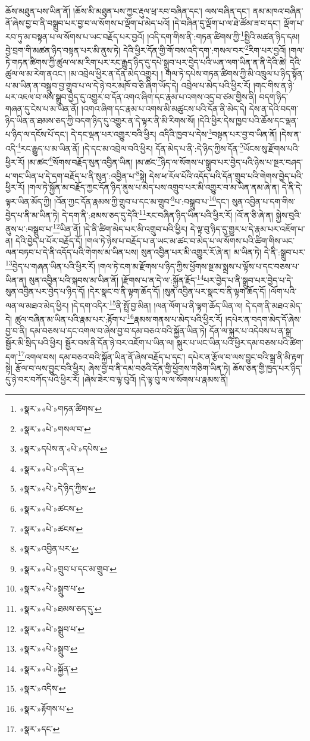 ཆོས་མཐུན་པས་ཡིན་ནོ། །ཆོས་མི་མཐུན་པས་ཀྱང་རྡུལ་ཕྲ་རབ་བཞིན་དང་། ལས་བཞིན་དང་། ནམ་མཁའ་བཞིན་ནོ་ཞེས་བྱ་བ་ནི་བསྒྲུབ་པར་བྱ་བ་ལ་སོགས་པ་ལྡོག་པ་མེད་པའོ། །དེ་བཞིན་དུ་ལྡོག་པ་ལ་ཐེ་ཚོམ་ཟ་བ་དང་། ལྡོག་པ་རབ་ཏུ་མ་བསྟན་པ་ལ་སོགས་པ་ཡང་བརྗོད་པར་བྱའོ། །འདི་དག་གིས་ནི་:གཏན་ཚིགས་ཀྱི་\footnote{«སྣར་»«པེ་»གཏན་ཚིགས་}སྤྱིའི་མཚན་ཉིད་དམ། བྱེ་བྲག་གི་མཚན་ཉིད་བསྟན་པར་མི་ནུས་ཏེ། དེའི་ཕྱིར་དོན་གྱི་གོ་བས་འདི་དག་:གསལ་བར་\footnote{«སྣར་»«པེ་»གསལ་བ་}རིག་པར་བྱའོ། །གལ་ཏེ་གཏན་ཚིགས་ཀྱི་ཚུལ་ལ་མ་རིག་པར་རང་རྒྱུད་ཉིད་དུ་དཔེ་སྒྲུབ་པར་བྱེད་པའི་ཡན་ལག་ཡིན་ན་ནི་དེའི་ཚེ། དེའི་ཚུལ་ལ་མ་རེག་ནའང་། །མ་འབྲེལ་ཕྱིར་ན་དོན་མེད་འགྱུར། །
གལ་ཏེ་དཔེས་གཏན་ཚིགས་ཀྱི་མི་འཁྲུལ་པ་ཉིད་སྟོན་པ་མ་ཡིན་ན་བསྒྲུབ་བྱ་གྲུབ་པ་ལ་དེ་ཉེ་བར་མཁོ་བ་ཅི་ཞིག་ཡོད་དེ། འབྲེལ་པ་མེད་པའི་ཕྱིར་རོ། །གང་གིས་ན་ཉེ་པར་འཇལ་བ་ལས་སྒྲུབ་བྱེད་དུ་འགྱུར་བ་དོན་འགའ་ཞིག་དང་རྣམ་པ་འགས་འདྲ་བ་ཙམ་གྱིས་ནི། བདག་ཉིད་གཞན་དུ་ངེས་པ་མ་ཡིན་ནོ། །འགའ་ཞིག་དང་རྣམ་པ་འགས་མི་མཚུངས་པའི་དོན་ནི་མེད་དེ། དེས་ན་དེའི་བདག་ཉིད་ཡིན་ན་ཐམས་ཅད་ཀྱི་བདག་ཉིད་དུ་འགྱུར་ན་དེ་ལྟར་ནི་མི་རིགས་སོ། །དེའི་ཕྱིར་དེས་ཁྱབ་པའི་ཆོས་དང་ལྡན་པ་ཉིད་ལ་དངོས་པོ་དང་། དེ་དང་ལྡན་པར་འགྱུར་བའི་ཕྱིར། འདིའི་ཁྱབ་པ་དེས་\footnote{«སྣར་»དཔེས་ན་«པེ་»དཔེས་}བསྟན་པར་བྱ་བ་ཡིན་ནོ། །དེས་ན་འདི་\footnote{«སྣར་»«པེ་»འདི་ན་}རང་རྒྱུད་པ་མ་ཡིན་ནོ། །དེ་དང་མ་འབྲེལ་བའི་ཕྱིར། དོན་མེད་པ་ནི་:དེ་ཉིད་ཀྱིས་དོན་\footnote{«སྣར་»«པེ་»དེ་ཉིད་ཀྱིས་}ཡོངས་སུ་རྫོགས་པའི་ཕྱིར་རོ། །མ་ཚང་\footnote{«སྣར་»«པེ་»ཚངས་}སོགས་བརྗོད་སུན་འབྱིན་ཡིན། །མ་ཚང་\footnote{«སྣར་»«པེ་»ཚངས་}ཉིད་ལ་སོགས་པ་སྒྲུབ་པར་བྱེད་པའི་ཉེས་པ་སྔར་བཤད་པ་གང་ཡིན་པ་དེ་དག་བརྗོད་པ་ནི་སུན་:འབྱིན་པ་\footnote{«སྣར་»འབྱིན་པར་}སྟེ། དེས་ཕ་རོལ་པོའི་འདོད་པའི་དོན་གྲུབ་པའི་གེགས་བྱེད་པའི་ཕྱིར་རོ། །གལ་ཏེ་སྐྱོན་མ་བརྗོད་ཀྱང་དོན་ཉིད་ནུས་པ་མེད་པས་འགྲུབ་པར་མི་འགྱུར་བ་མ་ཡིན་ནམ་ཞེ་ན། དེ་ནི་དེ་ལྟར་ཡིན་མོད་ཀྱི། །འོན་ཀྱང་དོན་རྣམས་ཀྱི་གྲུབ་པ་དང་མ་གྲུབ་\footnote{«སྣར་»«པེ་»གྲུབ་པ་དང་མ་གྲུབ་}པ་:བསྒྲུབ་པ་\footnote{«སྣར་»«པེ་»སྒྲུབ་པ་}དང་། སུན་འབྱིན་པ་དག་གིས་བྱེད་པ་ནི་མ་ཡིན་ཏེ། དེ་དག་ནི་:ཐམས་ཅད་དུ་དེའི་\footnote{«སྣར་»«པེ་»ཐམས་ཅད་དུ་}རང་བཞིན་ཉིད་ཡིན་པའི་ཕྱིར་རོ། །འོ་ན་ཅི་ཞེ་ན། སྐྱེས་བུའི་ནུས་པ་:བསྒྲུབ་པ་\footnote{«སྣར་»«པེ་»སྒྲུབ་པ་}ཡིན་ནོ། །དེ་ནི་ཚིག་མེད་པར་མི་འགྲུབ་པའི་ཕྱིར། དེ་ལྟ་བུ་ཉིད་དུ་གྱུར་པ་དེ་རྣམ་པར་འཇོག་པ་ན། དེའི་བྱེད་པ་པོར་བརྗོད་དོ། །གལ་ཏེ་ཉེས་པ་བརྗོད་པ་ན་ཡང་མ་ཚང་བ་མེད་པ་ལ་སོགས་པའི་ཚིག་གིས་ཡང་ལན་བཏབ་པ་དེ་ནི་འདོད་པའི་གེགས་མ་ཡིན་པས། སུན་འབྱིན་པར་མི་འགྱུར་རོ་ཞེ་ན། མ་ཡིན་ཏེ། དེ་ནི་:སྒྲུབ་པར་\footnote{«སྣར་»«པེ་»སྒྲུབ་}བྱེད་པ་གཞན་ཡིན་པའི་ཕྱིར་རོ། །གལ་ཏེ་ངག་མ་རྫོགས་པ་ཉིད་ཀྱིས་ཕྱོགས་སྔ་མ་སྨྲས་པ་ལྟོས་པ་དང་བཅས་པ་ཡིན་ན། སུན་འབྱིན་པའི་སྐབས་མ་ཡིན་ནོ། །རྫོགས་པ་ན་དེ་ལ་:སྐྱོན་རྗོད་\footnote{«སྣར་»«པེ་»སྐྱོན་}པར་བྱེད་པ་ནི་སྒྲུབ་པར་བྱེད་པ་དེ་སུན་འབྱིན་པར་བྱེད་པ་ཉིད་དོ། །དེར་སྣང་བ་ནི་ལྟག་ཆོད་དོ། །སུན་འབྱིན་པར་སྣང་བ་ནི་ལྟག་ཆོད་དོ། །ལོག་པའི་ལན་ལ་མཐའ་མེད་ཕྱིར། །དེ་དག་འདིར་\footnote{«སྣར་»འདིས་}ནི་སྤྲོ་བྱ་མིན། །ལན་ལོག་པ་ནི་ལྟག་ཆོད་ཡིན་ལ། དེ་དག་ནི་མཐའ་མེད་དེ། ཚུལ་བཞིན་མ་ཡིན་པའི་རྣམ་པར་:རྟོག་པ་\footnote{«སྣར་»རྟོགས་པ་}རྣམས་གནས་པ་མེད་པའི་ཕྱིར་རོ། །དཔེར་ན་བདག་མེད་དོ་ཞེས་བྱ་བ་ནི། དམ་བཅས་པ་དང་འགལ་བ་ཞེས་བྱ་བ་དམ་བཅའ་བའི་སྐྱོན་ཡིན་ཏེ། དོན་ལ་སྐུར་པ་འདེབས་པ་ན་སྒྲ་སྦྱོར་མི་སྲིད་པའི་ཕྱིར། སྦྱོར་བས་ནི་དོན་ཉེ་བར་འཇོག་པ་ཡིན་ལ། སྐུར་པ་ཡང་ཡིན་པའི་ཕྱིར་དམ་བཅས་པའི་ཚིག་དག་\footnote{«སྣར་»དང་}འགལ་བས། དམ་བཅའ་བའི་སྐྱོན་ཡིན་ནོ་ཞེས་བརྗོད་པ་དང་། དཔེར་ན་རྩོལ་བ་ལས་བྱུང་བའི་སྒྲ་ནི་མི་རྟག་སྟེ། རྩོལ་བ་ལས་བྱུང་བའི་ཕྱིར། ཞེས་བྱ་བ་ནི་དམ་བཅའི་དོན་གྱི་ཕྱོགས་གཅིག་ཡིན་ཏེ། ཆོས་ཅན་གྱི་ཁྱད་པར་ཉིད་དུ་ཉེ་བར་བཀོད་པའི་ཕྱིར་རོ། །ཞེས་ཟེར་བ་ལྟ་བུའོ། །དེ་ལྟ་བུ་ལ་ལ་སོགས་པ་རྣམས་ནི། 